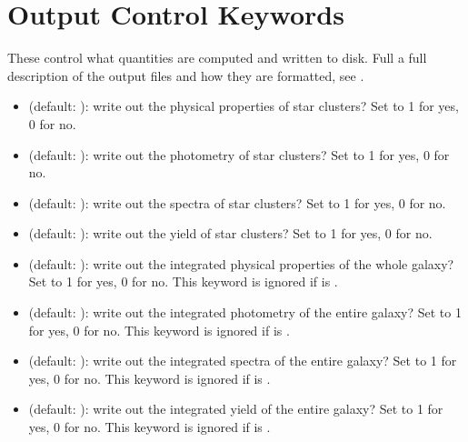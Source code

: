 \documentclass[letterpaper,10pt,english]{sphinxmanual}
\begin{document}
\section{Output Control Keywords}
\label{\detokenize{parameters:output-control-keywords}}
These control what quantities are computed and written to disk. Full a full description of the output files and how they are formatted, see {\hyperref[\detokenize{output:sec-output}]{}}.
\begin{itemize}
\item {} 
 (default: ): write out the physical properties of star clusters? Set to 1 for yes, 0 for no.

\item {} 
 (default: ): write out the photometry of star clusters? Set to 1 for yes, 0 for no.

\item {} 
 (default: ): write out the spectra of star clusters? Set to 1 for yes, 0 for no.

\item {} 
 (default: ): write out the yield of star clusters? Set to 1 for yes, 0 for no.

\item {} 
 (default: ): write out the integrated physical properties of the whole galaxy? Set to 1 for yes, 0 for no. This keyword is ignored if  is .

\item {} 
 (default: ): write out the integrated photometry of the entire galaxy? Set to 1 for yes, 0 for no. This keyword is ignored if  is .

\item {} 
 (default: ): write out the integrated spectra of the entire galaxy? Set to 1 for yes, 0 for no. This keyword is ignored if  is .

\item {} 
 (default: ): write out the integrated yield of the entire galaxy? Set to 1 for yes, 0 for no. This keyword is ignored if  is .


\end{itemize}
\end{document}
